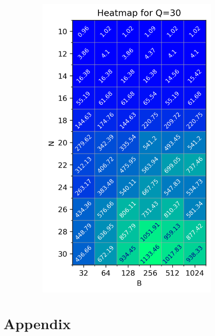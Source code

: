\documentclass[twocolumn]{article}
\begin{document}
\begin{figure}
    \centering
    \begin{subfigure}{0.47\linewidth}
        \includegraphics[width=\linewidth]{report/plots/heatmap_BvN_Q=30.png}
    \end{subfigure}
\end{figure}

\onecolumn

\newpage

\section{Appendix}
\end{document}
